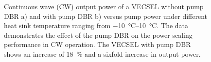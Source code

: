 \begin{figure}[ht]
    \centering
    \hfill
    \caption{Continuous wave (CW) output power of a VECSEL without pump DBR a) and with pump DBR b) versus pump power under different heat sink temperature ranging from \qtyrange{-10}{10}{\celsius}. The data demonstrates the effect of the pump DBR on the power scaling performance in CW operation. The VECSEL with pump DBR shows an increase of \qty{18}{\percent} and a sixfold increase in output power.}
    \label{fig:pslope}
\end{figure}



